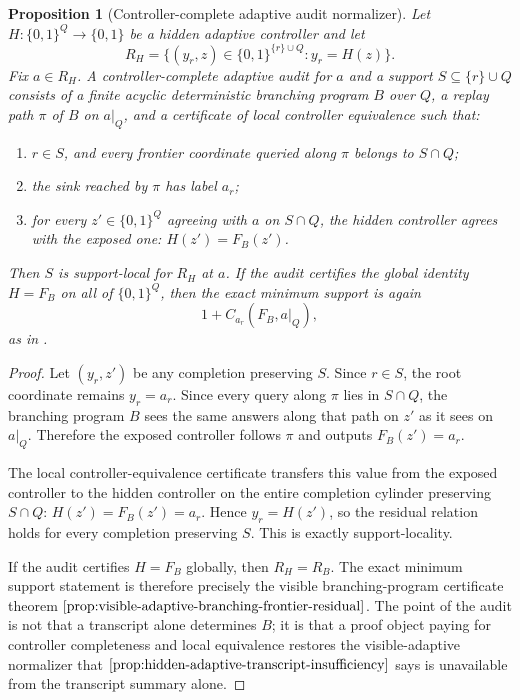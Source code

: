 \documentclass[11pt]{article}
\newtheorem{proposition}[theorem]{Proposition}
\theoremstyle{definition}
\newcommand{\bits}{\{0,1\}}
\begin{document}
\begin{proposition}[Controller-complete adaptive audit normalizer]\label{prop:controller-complete-adaptive-audit-normalizer}
Let \(H:\bits^Q\to\bits\) be a hidden adaptive controller and let
\[
  R_H=\{(y_r,z)\in\bits^{\{r\}\cup Q}:y_r=H(z)\}.
\]
Fix \(a\in R_H\).  A controller-complete adaptive audit for \(a\) and a support \(S\subseteq\{r\}\cup Q\) consists of a finite acyclic deterministic branching program \(B\) over \(Q\), a replay path \(\pi\) of \(B\) on \(a|_Q\), and a certificate of local controller equivalence such that:
\begin{enumerate}
\item \(r\in S\), and every frontier coordinate queried along \(\pi\) belongs to \(S\cap Q\);
\item the sink reached by \(\pi\) has label \(a_r\);
\item for every \(z'\in\bits^Q\) agreeing with \(a\) on \(S\cap Q\), the hidden controller agrees with the exposed one: \(H(z')=F_B(z')\).
\end{enumerate}
Then \(S\) is support-local for \(R_H\) at \(a\).  If the audit certifies the global identity \(H=F_B\) on all of \(\bits^Q\), then the exact minimum support is again
\[
  1+C_{a_r}(F_B,a|_Q),
\]
as in .
\end{proposition}

\begin{proof}
Let \((y_r,z')\) be any completion preserving \(S\).  Since \(r\in S\), the root coordinate remains \(y_r=a_r\).  Since every query along \(\pi\) lies in \(S\cap Q\), the branching program \(B\) sees the same answers along that path on \(z'\) as it sees on \(a|_Q\).  Therefore the exposed controller follows \(\pi\) and outputs \(F_B(z')=a_r\).

The local controller-equivalence certificate transfers this value from the exposed controller to the hidden controller on the entire completion cylinder preserving \(S\cap Q\): \(H(z')=F_B(z')=a_r\).  Hence \(y_r=H(z')\), so the residual relation holds for every completion preserving \(S\).  This is exactly support-locality.

If the audit certifies \(H=F_B\) globally, then \(R_H=R_B\).  The exact minimum support statement is therefore precisely the visible branching-program certificate theorem \(\Cref{prop:visible-adaptive-branching-frontier-residual}\).  The point of the audit is not that a transcript alone determines \(B\); it is that a proof object paying for controller completeness and local equivalence restores the visible-adaptive normalizer that \(\Cref{prop:hidden-adaptive-transcript-insufficiency}\) says is unavailable from the transcript summary alone.
\end{proof}
\end{document}
